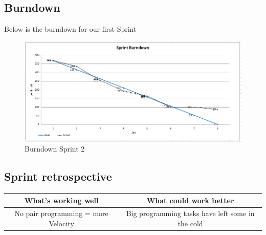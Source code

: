 \newpage
\subsection{Burndown}
Below is the burndown for our first Sprint
\begin{figure}[h]
\begin{center}
\includegraphics[scale=0.55]{img/SCRUM/burndownSprint2.png}
\caption{Burndown Sprint 2}
\label{fig:Burndown Sprint 2}
\end{center}
\end{figure}


\subsection{Sprint retrospective}

\begin{center}
\begin{tabular}{|c|c|}
\hline \textbf{What's working well} & \textbf{What could work better} \\ 
\hline No pair programming = more Velocity & Big programming tasks have left some in the cold \\ 
\hline 
\end{tabular} 
\end{center}




\newpage
